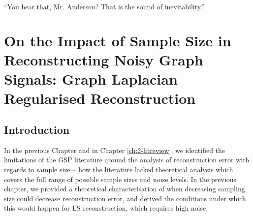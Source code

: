 
\begin{savequote}[8cm]
``You hear that, Mr. Anderson? That is the sound of inevitability.''
\end{savequote}

\chapter{\label{ch:proj1_GLR}On the Impact of Sample Size in Reconstructing Noisy Graph Signals: Graph Laplacian Regularised Reconstruction}

\section{Introduction}
In the previous Chapter and in Chapter \ref{ch:2-litreview}, we identified the limitations of the GSP literature around the analysis of reconstruction error with regards to sample size -- how the literature lacked theoretical analysis which covers the full range of possible sample sizes and noise levels. In the previous chapter, we provided a theoretical characterisation of when decreasing sampling size could decrease reconstruction error, and derived the conditions under which this would happen for LS reconstruction, which requires high noise.

